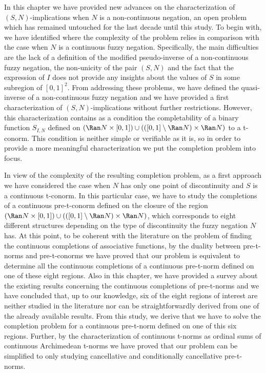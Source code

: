 In this chapter we have provided new advances on the characterization of $(S,N)$-implicati\-ons when $N$ is a non-continuous negation, an open problem which has remained untouched for the last decade until this study. To begin with, we have identified where the complexity of the problem relies in comparison with the case when $N$ is a continuous fuzzy negation. Specifically, the main difficulties are the lack of a definition of the modified pseudo-inverse of a non-continuous fuzzy negation, the non-unicity of the pair $(S,N)$ and the fact that the expression of $I$ does not provide any insights about the values of $S$ in some subregion of $[0,1]^2$.  From addressing these problems, we have defined the quasi-inverse of a non-continuous fuzzy negation and we have provided a first characterization of $(S,N)$-implications without further restrictions. However, this characterization contains as a condition the completability of a binary function $S_{I,N}$ defined on $(\Ran N \times [0,1]) \cup (([0,1] \setminus \Ran N) \times \Ran N)$ to a t-conorm. This condition is neither simple or verifiable as it is, so in order to provide a more meaningful characterization we put the completion problem into focus.

In view of the complexity of the resulting completion problem, as a first approach we have considered the case when $N$ has only one point of discontinuity and $S$ is a continuous t-conorm. In this particular case,  we have to study the completions of a continuous pre-t-conorm defined on the closure of the region $(\Ran N \times [0,1]) \cup (([0,1] \setminus \Ran N) \times \Ran N)$, which corresponds to eight different structures depending on the type of discontinuity the fuzzy negation $N$ has. At this point, to be coherent with the literature on the problem of finding the continuous completions of associative functions, by the duality between pre-t-norms and pre-t-conorms we have proved that our problem is equivalent to determine all the continuous completions of a continuous pre-t-norm defined on one of these eight regions. Also in this chapter, we have provided a survey about the existing results concerning the continuous completions of pre-t-norms and we have concluded that, up to our knowledge, six of the eight regions of interest are neither studied in the literature nor can be straightforwardly derived from one of the already available results. From this study, we derive that we have to solve the completion problem for a continuous pre-t-norm defined on one of this six regions. Further, by the characterization of continuous t-norms as ordinal sums of continuous Archimedean t-norms we have proved that our problem can be simplified to only studying cancellative and conditionally cancellative pre-t-norms.

